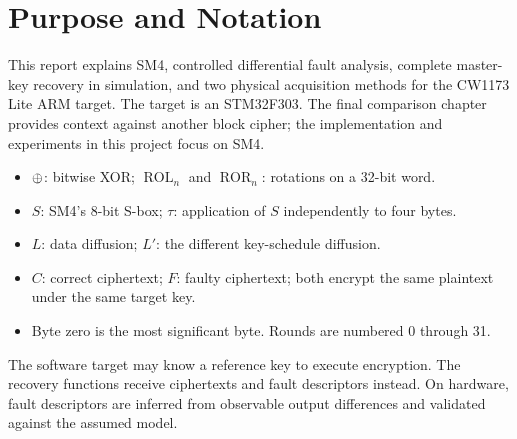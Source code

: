 \chapter{Purpose and Notation}
This report explains SM4, controlled differential fault analysis, complete master-key recovery in simulation, and two physical acquisition methods for the CW1173 Lite ARM target. The target is an STM32F303. The final comparison chapter provides context against another block cipher; the implementation and experiments in this project focus on SM4.
\begin{itemize}
\item $\mathbin{\oplus}$: bitwise XOR; $\operatorname{ROL}_n$ and $\operatorname{ROR}_n$: rotations on a 32-bit word.
\item $S$: SM4's 8-bit S-box; $\tau$: application of $S$ independently to four bytes.
\item $L$: data diffusion; $L'$: the different key-schedule diffusion.
\item $C$: correct ciphertext; $F$: faulty ciphertext; both encrypt the same plaintext under the same target key.
\item Byte zero is the most significant byte. Rounds are numbered 0 through 31.
\end{itemize}
The software target may know a reference key to execute encryption. The recovery functions receive ciphertexts and fault descriptors instead. On hardware, fault descriptors are inferred from observable output differences and validated against the assumed model.

